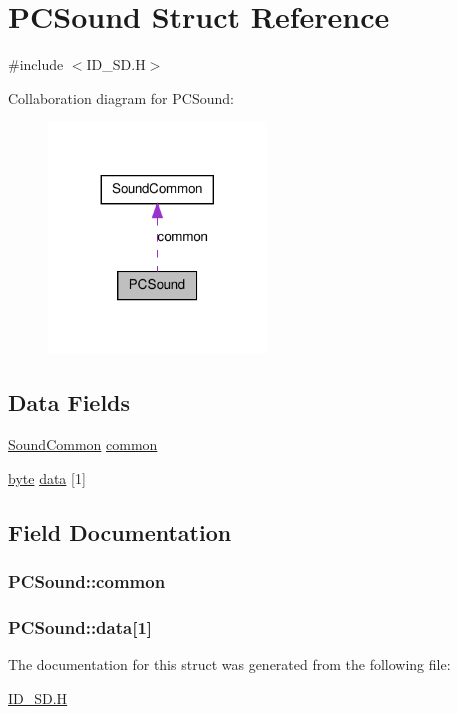 \hypertarget{structPCSound}{
\section{PCSound Struct Reference}
\label{structPCSound}
}


{\ttfamily \#include $<$ID\_\-SD.H$>$}



Collaboration diagram for PCSound:
\nopagebreak
\begin{figure}[H]
\begin{center}
\leavevmode
\includegraphics[width=164pt]{structPCSound__coll__graph}
\end{center}
\end{figure}
\subsection*{Data Fields}
\begin{DoxyCompactItemize}
\item 
\hyperlink{structSoundCommon}{SoundCommon} \hyperlink{structPCSound_ace1af90a3cc4729d7380665e7fe94f1d}{common}
\item 
\hyperlink{ID__HEAD_8H_a0c8186d9b9b7880309c27230bbb5e69d}{byte} \hyperlink{structPCSound_a91164f9a9420f68df8766be20e510294}{data} \mbox{[}1\mbox{]}
\end{DoxyCompactItemize}


\subsection{Field Documentation}
\hypertarget{structPCSound_ace1af90a3cc4729d7380665e7fe94f1d}{
\subsubsection[{common}]{ {\bf PCSound::common}}}
\label{structPCSound_ace1af90a3cc4729d7380665e7fe94f1d}
\hypertarget{structPCSound_a91164f9a9420f68df8766be20e510294}{
\subsubsection[{data}]{ {\bf PCSound::data}\mbox{[}1\mbox{]}}}
\label{structPCSound_a91164f9a9420f68df8766be20e510294}


The documentation for this struct was generated from the following file:\begin{DoxyCompactItemize}
\item 
\hyperlink{ID__SD_8H}{ID\_\-SD.H}\end{DoxyCompactItemize}
